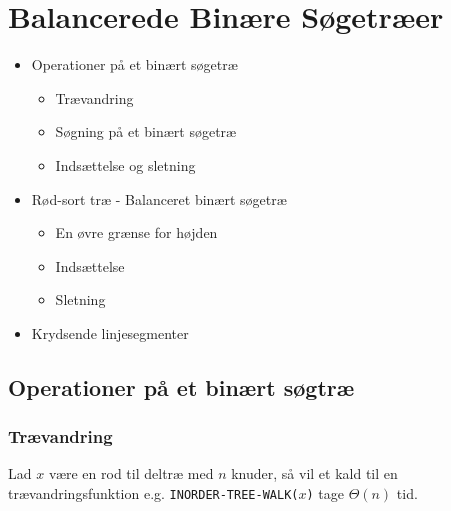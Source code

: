 \section{Balancerede Binære Søgetræer}
\hrulefill

\begin{itemize}
\item Operationer på et binært søgetræ
  \begin{itemize}
  \item Trævandring
  \item Søgning på et binært søgetræ
  \item Indsættelse og sletning
  \end{itemize}
\item Rød-sort træ - Balanceret binært søgetræ
  \begin{itemize}
  \item En øvre grænse for højden
  \item Indsættelse
  \item Sletning
  \end{itemize}
\item Krydsende linjesegmenter
\end{itemize}

\newpage
\subsection{Operationer på et binært søgtræ}

\subsubsection{Trævandring}

\begin{theorem}
  Lad $x$ være en rod til deltræ med $n$ knuder, så vil et kald til en trævandringsfunktion e.g. \texttt{INORDER-TREE-WALK($x$)} tage $\Theta(n)$ tid.
\end{theorem}

